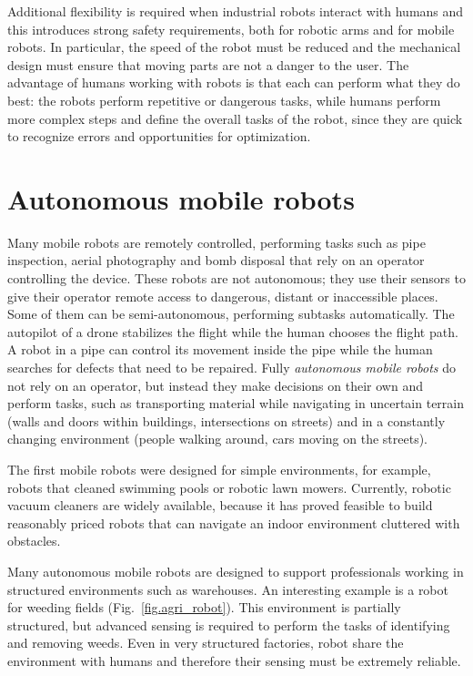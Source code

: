 Additional flexibility is required when industrial robots interact with humans and this introduces strong safety requirements, both for robotic arms and for mobile robots. In particular, the speed of the robot must be reduced and the mechanical design must ensure that moving parts are not a danger to the user. The advantage of humans working with robots is that each can perform what they do best: the robots perform repetitive or dangerous tasks, while humans perform more complex steps and define the overall tasks of the robot, since they are quick to recognize errors and opportunities for optimization.

\section{Autonomous mobile robots}

Many mobile robots are remotely controlled, performing tasks such as pipe inspection, aerial photography and bomb disposal that rely on an operator controlling the device. These robots are not autonomous; they use their sensors to give their operator remote access to dangerous, distant or inaccessible places. Some of them can be semi-autonomous, performing subtasks automatically. The autopilot of a drone stabilizes the flight while the human chooses the flight path. A robot in a pipe can control its movement inside the pipe while the human searches for defects that need to be repaired. Fully \emph{autonomous mobile robots} do not rely on an operator, but instead they make decisions on their own and perform tasks, such as transporting material while navigating in uncertain terrain (walls and doors within buildings, intersections on streets) and in a constantly changing environment (people walking around, cars moving on the streets).

The first mobile robots were designed for simple environments, for example, robots that cleaned swimming pools or robotic lawn mowers. Currently, robotic vacuum cleaners are widely available, because it has proved feasible to build reasonably priced robots that can navigate an indoor environment cluttered with obstacles.

Many autonomous mobile robots are designed to support professionals working in structured environments such as warehouses. An interesting example is a robot for weeding fields (Fig.~\ref{fig.agri_robot}). This environment is partially structured, but advanced sensing is required to perform the tasks of identifying and removing weeds. Even in very structured factories, robot share the environment with humans and therefore their sensing must be extremely reliable.

